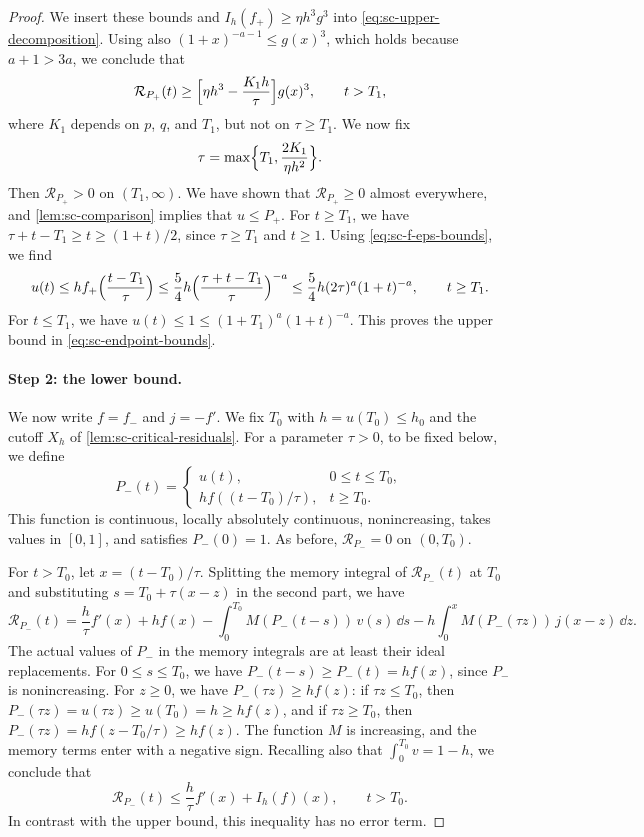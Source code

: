 \begin{proof}
We insert these bounds and $I_h(f_+)\ge\eta h^3g^3$ into \eqref{eq:sc-upper-decomposition}. Using also $(1+x)^{-a-1}\le g(x)^3$, which holds because $a+1>3a$, we conclude that
\[
 \mathcal R_{P_+}(t)\ge\Bigl[\eta h^3-\frac{K_1h}\tau\Bigr]g(x)^3,\qquad t>T_1,
\]
where $K_1$ depends on $p$, $q$, and $T_1$, but not on $\tau\ge T_1$. We now fix
\[
 \tau=\max\Bigl\{T_1,\frac{2K_1}{\eta h^2}\Bigr\}.
\]
Then $\mathcal R_{P_+}>0$ on $(T_1,\infty)$. We have shown that $\mathcal R_{P_+}\ge0$ almost everywhere, and \cref{lem:sc-comparison} implies that $u\le P_+$. For $t\ge T_1$, we have $\tau+t-T_1\ge t\ge(1+t)/2$, since $\tau\ge T_1$ and $t\ge1$. Using \eqref{eq:sc-f-eps-bounds}, we find
\[
 u(t)\le hf_+\Bigl(\frac{t-T_1}\tau\Bigr)\le\frac54h\Bigl(\frac{\tau+t-T_1}\tau\Bigr)^{-a}
 \le\frac54h(2\tau)^a(1+t)^{-a},\qquad t\ge T_1 .
\]
For $t\le T_1$, we have $u(t)\le1\le(1+T_1)^a(1+t)^{-a}$. This proves the upper bound in \eqref{eq:sc-endpoint-bounds}.

\paragraph{Step 2: the lower bound.} We now write $f=f_-$ and $j=-f'$. We fix $T_0$ with $h=u(T_0)\le h_0$ and the cutoff $X_h$ of \cref{lem:sc-critical-residuals}. For a parameter $\tau>0$, to be fixed below, we define
\[
 P_-(t)=
 \begin{cases}
 u(t),&0\le t\le T_0,\\
 hf((t-T_0)/\tau),&t\ge T_0.
 \end{cases}
\]
This function is continuous, locally absolutely continuous, nonincreasing, takes values in $[0,1]$, and satisfies $P_-(0)=1$. As before, $\mathcal R_{P_-}=0$ on $(0,T_0)$.

For $t>T_0$, let $x=(t-T_0)/\tau$. Splitting the memory integral of $\mathcal R_{P_-}(t)$ at $T_0$ and substituting $s=T_0+\tau(x-z)$ in the second part, we have
\[
 \mathcal R_{P_-}(t)=\frac h\tau f'(x)+hf(x)-\int_0^{T_0}M(P_-(t-s))\,v(s)\,\dd s
 -h\int_0^xM(P_-(\tau z))\,j(x-z)\,\dd z .
\]
The actual values of $P_-$ in the memory integrals are at least their ideal replacements. For $0\le s\le T_0$, we have $P_-(t-s)\ge P_-(t)=hf(x)$, since $P_-$ is nonincreasing. For $z\ge0$, we have $P_-(\tau z)\ge hf(z)$: if $\tau z\le T_0$, then $P_-(\tau z)=u(\tau z)\ge u(T_0)=h\ge hf(z)$, and if $\tau z\ge T_0$, then $P_-(\tau z)=hf(z-T_0/\tau)\ge hf(z)$. The function $M$ is increasing, and the memory terms enter with a negative sign. Recalling also that $\int_0^{T_0}v=1-h$, we conclude that
\[
 \mathcal R_{P_-}(t)\le\frac h\tau f'(x)+I_h(f)(x),\qquad t>T_0 .
\]
In contrast with the upper bound, this inequality has no error term.


\end{proof}
